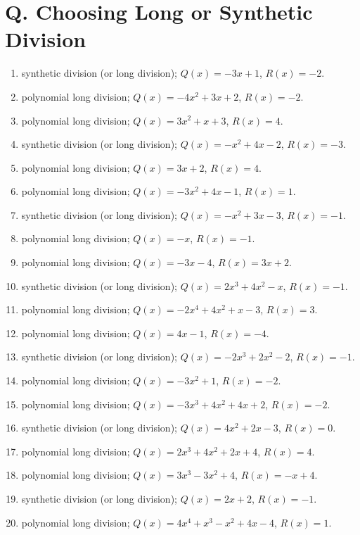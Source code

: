 \documentclass[11pt,oneside]{book}
\begin{document}
\section*{Q. Choosing Long or Synthetic Division}
\begin{enumerate}[leftmargin=*,label=\textbf{Q\arabic*.},itemsep=0.45\baselineskip]
\item synthetic division (or long division); $Q(x)=- 3 x + 1$, $R(x)=-2$.
\item polynomial long division; $Q(x)=- 4 x^{2} + 3 x + 2$, $R(x)=-2$.
\item polynomial long division; $Q(x)=3 x^{2} + x + 3$, $R(x)=4$.
\item synthetic division (or long division); $Q(x)=- x^{2} + 4 x - 2$, $R(x)=-3$.
\item polynomial long division; $Q(x)=3 x + 2$, $R(x)=4$.
\item polynomial long division; $Q(x)=- 3 x^{2} + 4 x - 1$, $R(x)=1$.
\item synthetic division (or long division); $Q(x)=- x^{2} + 3 x - 3$, $R(x)=-1$.
\item polynomial long division; $Q(x)=- x$, $R(x)=-1$.
\item polynomial long division; $Q(x)=- 3 x - 4$, $R(x)=3 x + 2$.
\item synthetic division (or long division); $Q(x)=2 x^{3} + 4 x^{2} - x$, $R(x)=-1$.
\item polynomial long division; $Q(x)=- 2 x^{4} + 4 x^{2} + x - 3$, $R(x)=3$.
\item polynomial long division; $Q(x)=4 x - 1$, $R(x)=-4$.
\item synthetic division (or long division); $Q(x)=- 2 x^{3} + 2 x^{2} - 2$, $R(x)=-1$.
\item polynomial long division; $Q(x)=- 3 x^{2} + 1$, $R(x)=-2$.
\item polynomial long division; $Q(x)=- 3 x^{3} + 4 x^{2} + 4 x + 2$, $R(x)=-2$.
\item synthetic division (or long division); $Q(x)=4 x^{2} + 2 x - 3$, $R(x)=0$.
\item polynomial long division; $Q(x)=2 x^{3} + 4 x^{2} + 2 x + 4$, $R(x)=4$.
\item polynomial long division; $Q(x)=3 x^{3} - 3 x^{2} + 4$, $R(x)=- x + 4$.
\item synthetic division (or long division); $Q(x)=2 x + 2$, $R(x)=-1$.
\item polynomial long division; $Q(x)=4 x^{4} + x^{3} - x^{2} + 4 x - 4$, $R(x)=1$.

\end{enumerate}
\end{document}
